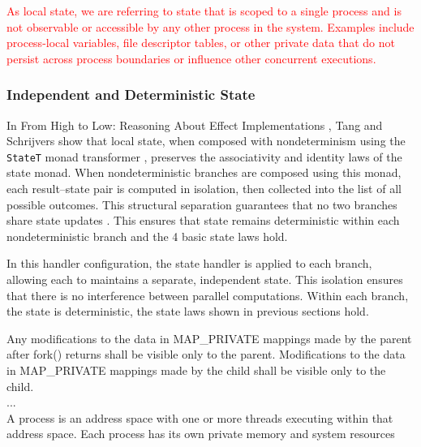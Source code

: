 \documentclass[logo,bsc,singlespacing,parskip]{infthesis}
\begin{document}
\textcolor{red}{As local state, we are referring to  state that is scoped to a single process and is not observable or accessible by any other process in the system. Examples include process-local variables, file descriptor tables, or other private data that do not persist across process boundaries or influence other concurrent executions. 
}

\subsubsection{Independent and Deterministic State} 
In From High to Low: Reasoning About Effect Implementations \cite{hightoLow}, Tang and Schrijvers show that local state, when composed with nondeterminism using the \lstinline{StateT} monad transformer \cite{jones1995}, preserves the associativity and identity laws of the state monad. When nondeterministic branches are composed using this monad, each result–state pair is computed in isolation, then collected into the list of all possible outcomes. This structural separation guarantees that no two branches share state updates \cite{JustDoIt}. This ensures that state remains deterministic within each nondeterministic branch and the 4 basic state laws hold.

In this handler configuration, the state handler is applied to each branch, allowing each to maintains a separate, independent state. This isolation ensures that there is no interference between parallel computations. Within each branch, the state is deterministic, the state laws shown in previous sections hold.

\begin{tcolorbox}[colback=gray!10, colframe=gray!60, sharp corners, boxrule=0.5pt, title={POSIX Base Specifications, Issue 7, p.899}]
    Any modifications to the data in
 MAP\_PRIVATE mappings made by the parent after fork() returns shall be visible only to
 the parent. Modifications to the data in MAP\_PRIVATE mappings made by the child shall
 be visible only to the child.
  \\ ... \\
A process is an address space with one or more threads executing within that address space. Each process has its own private memory and system resources
\end{tcolorbox}
\end{document}

